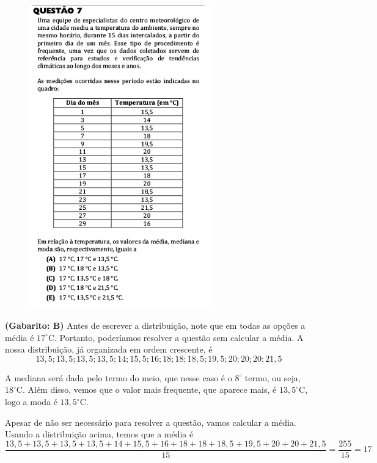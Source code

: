 \documentclass[a4paper]{article}
\begin{document}
\begin{figure}[H]
	\begin{center}
		\includegraphics[width=8cm]{L1Q7.png}
	\end{center}
\end{figure}
\par\textbf{(Gabarito: B)} Antes de escrever a distribuição, note que em todas as opções a média é $17^\circ$C. Portanto, poderíamos resolver a questão sem calcular a média. A nossa distribuição, já organizada em ordem crescente, é
\begin{equation*}
13,5; 13,5; 13,5; 13,5; 14; 15,5; 16; 18; 18; 18,5; 19,5; 20; 20; 20; 21,5 
\end{equation*}
\par\vspace{0.3cm} A mediana será dada pelo termo do meio, que nesse caso é o $8^\circ$ termo, ou seja, $18^\circ$C. Além disso, vemos que o valor mais frequente, que aparece mais, é $13,5^\circ$C, logo a moda é $13,5^\circ$C.
\par\vspace{0.3cm} Apesar de não ser necessário para resolver a questão, vamos calcular a média. Usando a distribuição acima, temos que a média é
\begin{equation*}
\frac{13,5+13,5+13,5+13,5+14+15,5+16+18+18+18,5+19,5+20+20+21,5}{15} = \frac{255}{15} = 17
\end{equation*}
\end{document}
